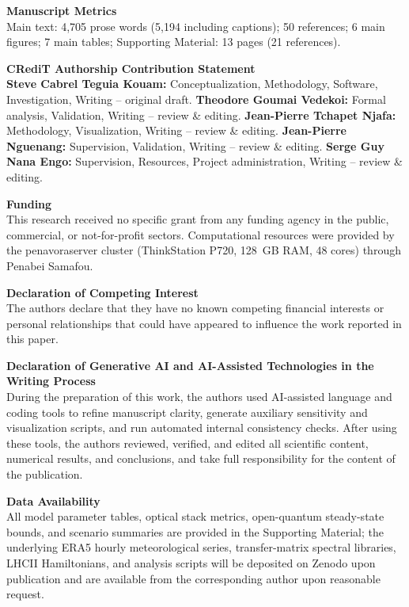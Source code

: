 \documentclass[10pt,a4paper]{article}
\begin{document}
\vspace{0.4em}
\noindent
\textbf{Manuscript Metrics}\\
Main text: 4,705 prose words (5,194 including captions); 50 references; 6 main figures; 7 main tables; Supporting Material: 13 pages (21 references).

\vspace{0.4em}
\noindent
\textbf{CRediT Authorship Contribution Statement}\\
\textbf{Steve Cabrel Teguia Kouam:} Conceptualization, Methodology, Software, Investigation, Writing -- original draft. \textbf{Theodore Goumai Vedekoi:} Formal analysis, Validation, Writing -- review \& editing. \textbf{Jean-Pierre Tchapet Njafa:} Methodology, Visualization, Writing -- review \& editing. \textbf{Jean-Pierre Nguenang:} Supervision, Validation, Writing -- review \& editing. \textbf{Serge Guy Nana Engo:} Supervision, Resources, Project administration, Writing -- review \& editing.

\vspace{0.4em}
\noindent
\textbf{Funding}\\
This research received no specific grant from any funding agency in the public, commercial, or not-for-profit sectors. Computational resources were provided by the penavoraserver cluster (ThinkStation P720, 128~GB RAM, 48 cores) through Penabei Samafou.

\vspace{0.4em}
\noindent
\textbf{Declaration of Competing Interest}\\
The authors declare that they have no known competing financial interests or personal relationships that could have appeared to influence the work reported in this paper.

\vspace{0.4em}
\noindent
\textbf{Declaration of Generative AI and AI-Assisted Technologies in the Writing Process}\\
During the preparation of this work, the authors used AI-assisted language and coding tools to refine manuscript clarity, generate auxiliary sensitivity and visualization scripts, and run automated internal consistency checks. After using these tools, the authors reviewed, verified, and edited all scientific content, numerical results, and conclusions, and take full responsibility for the content of the publication.

\vspace{0.4em}
\noindent
\textbf{Data Availability}\\
All model parameter tables, optical stack metrics, open-quantum steady-state bounds, and scenario summaries are provided in the Supporting Material; the underlying ERA5 hourly meteorological series, transfer-matrix spectral libraries, LHCII Hamiltonians, and analysis scripts will be deposited on Zenodo upon publication and are available from the corresponding author upon reasonable request.
\end{document}
